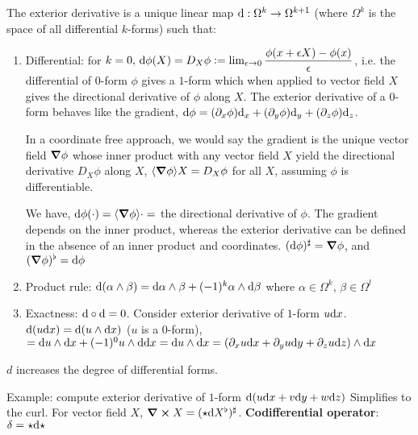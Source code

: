 \begin{definition}
    The exterior derivative is a unique linear map $\mathrm{d}:\Omega^k\rightarrow\Omega^{k+1}$ (where $\Omega^k$ is the space of all differential $k$-forms) such that:
    \begin{enumerate}
        \item Differential: for $k=0, \, \mathrm{d}\phi(X)=D_X\phi \mathrel{\mathop:}= \lim_{\epsilon\rightarrow0}\dfrac{\phi(x+\epsilon X) - \phi(x)}{\epsilon}$, i.e. the differential of $0$-form $\phi$ gives a $1$-form which when applied to vector field $X$ gives the directional derivative of $\phi$ along $X$. The exterior derivative of a $0$-form behaves like the gradient, $\mathrm{d}\phi = (\partial_x\phi)\mathrm{d}_x + (\partial_y\phi )\mathrm{d}_y + (\partial_z\phi)\mathrm{d}_z$.
        
        In a coordinate free approach, we would say the gradient is the unique vector field $\boldsymbol{\nabla}\phi$ whose inner product with any vector field $X$ yield the directional derivative $D_X\phi$ along $X$, $\langle \boldsymbol{\nabla}\phi \rangle{X} = D_X\phi$ for all $X$, assuming $\phi$ is differentiable.
        
        We have, $\mathrm{d}\phi(\cdot) = \langle \boldsymbol{\nabla}\phi \rangle{\cdot}=$ the directional derivative of $\phi$. The gradient depends on the inner product, whereas the exterior derivative can be defined in the absence of an inner product and coordinates. $(\mathrm{d}\phi)^\sharp = \boldsymbol{\nabla}\phi$, and $(\boldsymbol{\nabla}\phi)^\flat = \mathrm{d}\phi$
        
        \item Product rule: $\mathrm{d}(\alpha\wedge\beta) = \mathrm{d}\alpha\wedge\beta + (-1)^k\alpha\wedge\mathrm{d}\beta$ where $\alpha\in\Omega^k$, $\beta\in\Omega^l$
        \item Exactness: $\mathrm{d} \circ \mathrm{d} = 0$. Consider exterior derivative of $1$-form $u\mathrm{d} x$. $\mathrm{d} (u \mathrm{d} x) = \mathrm{d} (u\wedge \mathrm{d} x)$ ($u$ is a $0$-form), $= \mathrm{d} u \wedge \mathrm{d} x + (-1)^0 u\wedge \mathrm{d}\mathrm{d} x = \mathrm{d} u \wedge \mathrm{d} x = (\partial_x u\mathrm{d} x + \partial_y u\mathrm{d} y + \partial_z u\mathrm{d} z)\wedge \mathrm{d} x$
    \end{enumerate}
    
    $d$ increases the degree of differential forms.
\end{definition}

Example: compute exterior derivative of $1$-form $\mathrm{d}(u \mathrm{d} x + v \mathrm{d} y + w \mathrm{d} z)$
Simplifies to the curl. For vector field $X$, $\boldsymbol{\nabla}\cross X = (\star \mathrm{d} X^\flat)^\sharp$. \textbf{Codifferential operator}: $\delta = \star\mathrm{d}\star$

